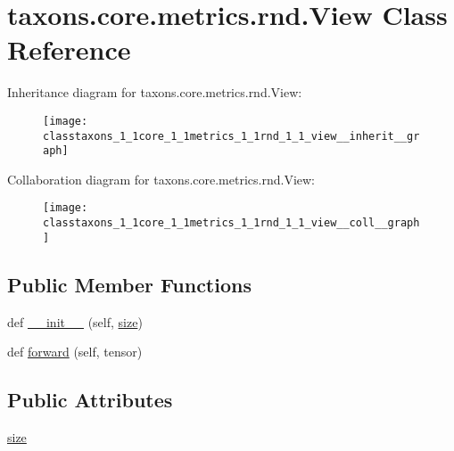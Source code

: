 \hypertarget{classtaxons_1_1core_1_1metrics_1_1rnd_1_1_view}{}\section{taxons.\+core.\+metrics.\+rnd.\+View Class Reference}
\label{classtaxons_1_1core_1_1metrics_1_1rnd_1_1_view}


Inheritance diagram for taxons.\+core.\+metrics.\+rnd.\+View\+:
\nopagebreak
\begin{figure}[H]
\begin{center}
\leavevmode
\texttt{[image: classtaxons\_1\_1core\_1\_1metrics\_1\_1rnd\_1\_1\_view\_\_inherit\_\_graph]}
\end{center}
\end{figure}


Collaboration diagram for taxons.\+core.\+metrics.\+rnd.\+View\+:
\nopagebreak
\begin{figure}[H]
\begin{center}
\leavevmode
\texttt{[image: classtaxons\_1\_1core\_1\_1metrics\_1\_1rnd\_1\_1\_view\_\_coll\_\_graph]}
\end{center}
\end{figure}
\subsection*{Public Member Functions}
\begin{DoxyCompactItemize}
\item 
def \hyperlink{classtaxons_1_1core_1_1metrics_1_1rnd_1_1_view_aaa94791bdfd9b90bee80b95f0f7e75f6}{\+\_\+\+\_\+init\+\_\+\+\_\+} (self, \hyperlink{classtaxons_1_1core_1_1metrics_1_1rnd_1_1_view_a2ffa3e9054c13eed8992919a55edbefe}{size})
\item 
def \hyperlink{classtaxons_1_1core_1_1metrics_1_1rnd_1_1_view_aa8b751ef46c3b21f6f67f5fa511fd989}{forward} (self, tensor)
\end{DoxyCompactItemize}
\subsection*{Public Attributes}
\begin{DoxyCompactItemize}
\item 
\hyperlink{classtaxons_1_1core_1_1metrics_1_1rnd_1_1_view_a2ffa3e9054c13eed8992919a55edbefe}{size}
\end{DoxyCompactItemize}


